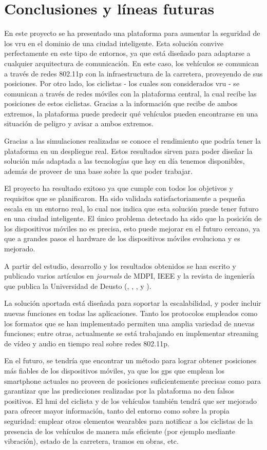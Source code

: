 \chapter{Conclusiones y líneas futuras}
En este proyecto se ha presentado una plataforma para aumentar la seguridad de
los \gls{vru} en el dominio de una ciudad inteligente. Esta solución convive
perfectamente en este tipo de entornos, ya que está diseñado para adaptarse a
cualquier arquitectura de comunicación. En este caso, los vehículos se
comunican a través de redes \gls{802.11p} con la infraestructura de la
carretera, proveyendo de sus posiciones. Por otro lado, los ciclistas - los
cuales son considerados \gls{vru} - se comunican a través de redes móviles con
la plataforma central, la cual recibe las posiciones de estos ciclistas.
Gracias a la información que recibe de ambos extremos, la plataforma puede
predecir qué vehículos pueden encontrarse en una situación de peligro y avisar
a ambos extremos.

Gracias a las simulaciones realizadas se conoce el rendimiento que podría tener
la plataforma en un despliegue real. Estos resultados sirven para poder diseñar
la solución más adaptada a las tecnologías que hoy en día tenemos disponibles,
además de proveer de una base sobre la que poder trabajar.

El proyecto ha resultado exitoso ya que cumple con todos los objetivos y
requisitos que se planificaron. Ha sido validada satisfactoriamente a pequeña
escala en un entorno real, lo cual nos indica que esta solución puede tener
futuro en una ciudad inteligente. El único problema detectado ha sido que la
posición de los dispositivos móviles no es precisa, esto puede mejorar en el
futuro cercano, ya que a grandes pasos el hardware de los dispositivos móviles
evoluciona y es mejorado.

A partir del estudio, desarrollo y los resultados obtenidos se han escrito
y publicado varios artículos en \emph{journals} de MDPI, IEEE y la revista
de ingeniería que publica la Universidad de Deusto (\cite{valert},
\cite{poster_wearable}, \cite{coop_vru}, y \cite{cs4vru}).

La solución aportada está diseñada para soportar la escalabilidad, y poder
incluir nuevas funciones en todas las aplicaciones. Tanto los protocolos
empleados como los formatos que se han implementado permiten una amplia
variedad de nuevas funciones; entre otras, actualmente se está trabajando en
implementar streaming de vídeo y audio en tiempo real sobre redes \gls{802.11p}.

En el futuro, se tendría que encontrar un método para lograr obtener posiciones
más fiables de los dispositivos móviles, ya que los \gls{gps} que emplean los
smartphone actuales no proveen de posiciones suficientemente precisas como para
garantizar que las predicciones realizadas por la plataforma no den falsos
positivos. El \gls{hmi} del ciclista y de los vehículos también tendrá que ser
mejorado para ofrecer mayor información, tanto del entorno como sobre la propia
seguridad: emplear otros elementos wearables para notificar a los ciclistas de
la presencia de los vehículos de manera más eficiente (por ejemplo mediante
vibración), estado de la carretera, tramos en obras, etc.
